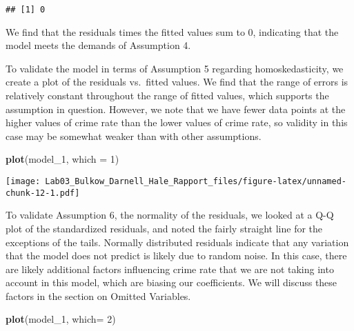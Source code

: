 \documentclass[]{article}
\newenvironment{Shaded}{\begin{snugshade}}{\end{snugshade}}
\newcommand{\KeywordTok}[1]{\textcolor[rgb]{0.13,0.29,0.53}{\textbf{#1}}}
\newcommand{\DataTypeTok}[1]{\textcolor[rgb]{0.13,0.29,0.53}{#1}}
\newcommand{\DecValTok}[1]{\textcolor[rgb]{0.00,0.00,0.81}{#1}}
\newcommand{\StringTok}[1]{\textcolor[rgb]{0.31,0.60,0.02}{#1}}
\newcommand{\OperatorTok}[1]{\textcolor[rgb]{0.81,0.36,0.00}{\textbf{#1}}}
\newcommand{\NormalTok}[1]{#1}
\begin{document}
\begin{Shaded}
\end{Shaded}

\begin{verbatim}
## [1] 0
\end{verbatim}

We find that the residuals times the fitted values sum to 0, indicating
that the model meets the demands of Assumption 4.

To validate the model in terms of Assumption 5 regarding
homoskedasticity, we create a plot of the residuals vs.~fitted values.
We find that the range of errors is relatively constant throughout the
range of fitted values, which supports the assumption in question.
However, we note that we have fewer data points at the higher values of
crime rate than the lower values of crime rate, so validity in this case
may be somewhat weaker than with other assumptions.

\begin{Shaded}
\begin{Highlighting}[]
\KeywordTok{plot}\NormalTok{(model_}\DecValTok{1}\NormalTok{, }\DataTypeTok{which =} \DecValTok{1}\NormalTok{)}
\end{Highlighting}
\end{Shaded}

\texttt{[image: Lab03\_Bulkow\_Darnell\_Hale\_Rapport\_files/figure-latex/unnamed-chunk-12-1.pdf]}

To validate Assumption 6, the normality of the residuals, we looked at a
Q-Q plot of the standardized residuals, and noted the fairly straight
line for the exceptions of the tails. Normally distributed residuals
indicate that any variation that the model does not predict is likely
due to random noise. In this case, there are likely additional factors
influencing crime rate that we are not taking into account in this
model, which are biasing our coefficients. We will discuss these factors
in the section on Omitted Variables.

\begin{Shaded}
\begin{Highlighting}[]
\KeywordTok{plot}\NormalTok{(model_}\DecValTok{1}\NormalTok{, }\DataTypeTok{which=} \DecValTok{2}\NormalTok{)}
\end{Highlighting}
\end{Shaded}
\end{document}
